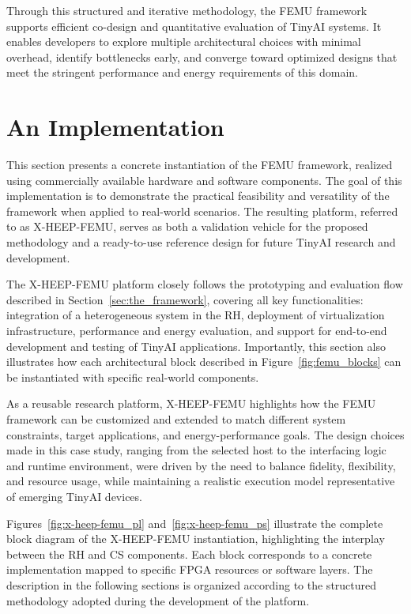             Through this structured and iterative methodology, the \mbox{FEMU} framework supports efficient co-design and quantitative evaluation of TinyAI systems. It enables developers to explore multiple architectural choices with minimal overhead, identify bottlenecks early, and converge toward optimized designs that meet the stringent performance and energy requirements of this domain.

    \section{An Implementation}
    \label{sec:an_implementation}
    
        This section presents a concrete instantiation of the \mbox{FEMU} framework, realized using commercially available hardware and software components. The goal of this implementation is to demonstrate the practical feasibility and versatility of the framework when applied to real-world scenarios. The resulting platform, referred to as \mbox{X-HEEP-FEMU}, serves as both a validation vehicle for the proposed methodology and a ready-to-use reference design for future TinyAI research and development.
        
        The \mbox{X-HEEP-FEMU} platform closely follows the prototyping and evaluation flow described in Section~\ref{sec:the_framework}, covering all key functionalities: integration of a heterogeneous system in the RH, deployment of virtualization infrastructure, performance and energy evaluation, and support for end-to-end development and testing of TinyAI applications. Importantly, this section also illustrates how each architectural block described in Figure~\ref{fig:femu_blocks} can be instantiated with specific real-world components.
        
        As a reusable research platform, \mbox{X-HEEP-FEMU} highlights how the \mbox{FEMU} framework can be customized and extended to match different system constraints, target applications, and energy-performance goals. The design choices made in this case study, ranging from the selected host to the interfacing logic and runtime environment, were driven by the need to balance fidelity, flexibility, and resource usage, while maintaining a realistic execution model representative of emerging TinyAI devices.
        
        Figures~\ref{fig:x-heep-femu_pl} and~\ref{fig:x-heep-femu_ps} illustrate the complete block diagram of the \mbox{X-HEEP-FEMU} instantiation, highlighting the interplay between the RH and CS components. Each block corresponds to a concrete implementation mapped to specific FPGA resources or software layers. The description in the following sections is organized according to the structured methodology adopted during the development of the platform.

